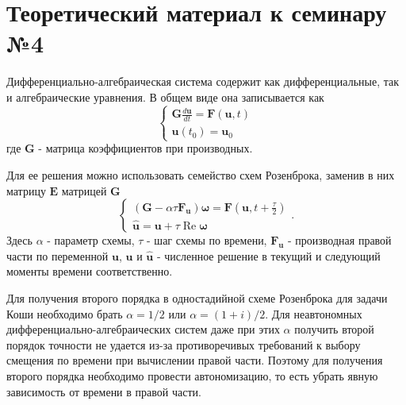 \section{Теоретический материал к семинару №4}
Дифференциально-алгебраическая система содержит как дифференциальные, так и алгебраические уравнения. В общем виде она записывается как
\begin{equation} \label{c4eq1}
	\begin{cases}
		\displaystyle \mathbf{G} \frac{d\mathbf{u}}{dt} = \mathbf{F} \left( \mathbf{u}, t \right) \\
		\mathbf{u}(t_0) = \mathbf{u}_0
	\end{cases}
\end{equation}
где $\mathbf{G}$ - матрица коэффициентов при производных. 

Для ее решения можно использовать семейство схем Розенброка, заменив в них матрицу $\mathbf{E}$ матрицей $\mathbf{G}$  
\begin{equation} \label{c4eq2}
	\begin{cases}
		\displaystyle \left( \mathbf{G} - \alpha \tau \mathbf{F_u} \right) \boldsymbol{\omega} = \mathbf{F} \left( \mathbf{u}, t + \frac{\tau}{2} \right) \\
		\mathbf{\hat{u}} = \mathbf{u} + \tau \operatorname{Re} \boldsymbol{\omega}
	\end{cases}.
\end{equation}
Здесь $\alpha$ - параметр схемы, $\tau$ - шаг схемы по времени, $\mathbf{F_u}$ - производная правой части по переменной $\mathbf{u}$, $\mathbf{u}$ и $\mathbf{\hat{u}}$ - численное решение в текущий и следующий моменты времени соответственно.

Для получения второго порядка в одностадийной схеме Розенброка для задачи Коши необходимо брать
$\alpha = 1/2$ или $\alpha = (1+i)/2$. Для неавтономных дифференциально-алгебраических систем даже при этих $\alpha$ получить второй порядок точности не удается из-за противоречивых требований к выбору смещения по времени при вычислении правой части. Поэтому для получения второго порядка необходимо провести автономизацию, то есть убрать явную зависимость от времени в правой части.

